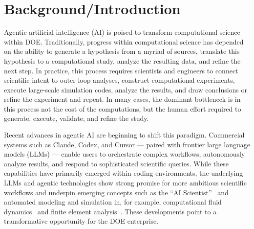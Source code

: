 \documentclass[11pt]{article} \usepackage[margin=1in]{geometry}
\begin{document}
\clearpage {}



\section{Background/Introduction} 
Agentic artificial intelligence (AI) is poised to transform computational
science within DOE.  Traditionally, progress within computational
science has depended on the ability to generate a hypothesis from a myriad of
sources, translate this hypothesis to a computational study, analyze the
resulting data, and refine the next step.  In practice, this process requires
scientists and engineers to connect
scientific intent to outer-loop analyses, construct computational experiments,
execute large-scale simulation codes, analyze the results, and draw conclusions
or refine the experiment and repeat.  In many cases, the dominant bottleneck is
in this process not the cost of the computations, but the human effort required to generate,
execute, validate, and refine the study.

Recent advances in agentic AI are beginning to shift this paradigm. Commercial
systems such as Claude, Codex, and Cursor --- paired with frontier large language
models (LLMs) --- enable users to orchestrate complex workflows, autonomously
analyze results, and respond to sophisticated scientific queries. While these
capabilities have primarily emerged within coding environments, the underlying
LLMs and agentic technologies show strong promise for more ambitious scientific
workflows and underpin emerging concepts such as the ``AI Scientist''~\cite{lu2024aiscientistfullyautomated} and automated modeling and simulation in, for example, computational fluid dynamics~\cite{PaRaWa25,yue2026foamagentautomatedintelligentcfd,chen2024metaopenfoamllmbasedmultiagentframework,FENG2026100620} and finite element analysis~\cite{qi2025feagptendtoendagenticaifinite}. These developments point to a
transformative opportunity for the DOE enterprise.
\end{document}
